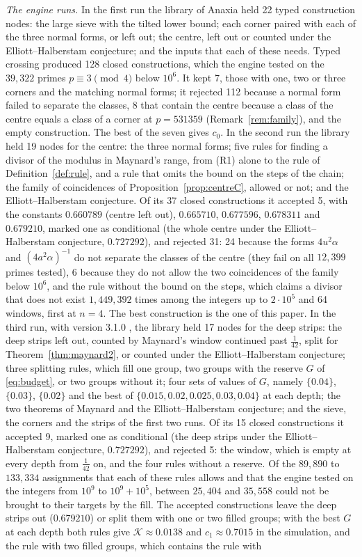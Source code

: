 \documentclass[aps,prd,twocolumn,superscriptaddress,nofootinbib,longbibliography,floatfix,showkeys,nobalancelastpage,amsmath,amssymb,10pt]{revtex4-2}
\theoremstyle{plain}
\theoremstyle{definition}
\theoremstyle{plain}
\newcommand{\Kc}{\mathcal{K}}
\newcommand{\Kmc}{0.0138}
\newcommand{\cmc}{0.7015}
\begin{document}
\emph{The engine runs.} In the first run the library of Anaxia held 22 typed construction nodes: the large sieve with the tilted lower bound; each corner paired with each of the three normal forms, or left out; the centre, left out or counted under the Elliott--Halberstam conjecture; and the inputs that each of these needs. Typed crossing produced 128 closed constructions, which the engine tested on the $39{,}322$ primes $p\equiv3\pmod4$ below $10^6$. It kept 7, those with one, two or three corners and the matching normal forms; it rejected 112 because a normal form failed to separate the classes, 8 that contain the centre because a class of the centre equals a class of a corner at $p=531359$ (Remark~\ref{rem:family}), and the empty construction. The best of the seven gives $c_0$. In the second run the library held 19 nodes for the centre: the three normal forms; five rules for finding a divisor of the modulus in Maynard's range, from (R1) alone to the rule of Definition~\ref{def:rule}, and a rule that omits the bound on the steps of the chain; the family of coincidences of Proposition~\ref{prop:centreC}, allowed or not; and the Elliott--Halberstam conjecture. Of its 37 closed constructions it accepted 5, with the constants $0.660789$ (centre left out), $0.665710$, $0.677596$, $0.678311$ and $0.679210$, marked one as conditional (the whole centre under the Elliott--Halberstam conjecture, $0.727292$), and rejected 31: 24 because the forms $4u^2\alpha$ and $(4a^2\alpha)^{-1}$ do not separate the classes of the centre (they fail on all $12{,}399$ primes tested), 6 because they do not allow the two coincidences of the family below $10^6$, and the rule without the bound on the steps, which claims a divisor that does not exist $1{,}449{,}392$ times among the integers up to $2\cdot10^5$ and 64 windows, first at $n=4$. The best construction is the one of this paper. In the third run, with version 3.1.0 \cite{Ana31}, the library held 17 nodes for the deep strips: the deep strips left out, counted by Maynard's window continued past $\frac1{42}$, split for Theorem~\ref{thm:maynard2}, or counted under the Elliott--Halberstam conjecture; three splitting rules, which fill one group, two groups with the reserve $G$ of \eqref{eq:budget}, or two groups without it; four sets of values of $G$, namely $\{0.04\}$, $\{0.03\}$, $\{0.02\}$ and the best of $\{0.015,0.02,0.025,0.03,0.04\}$ at each depth; the two theorems of Maynard and the Elliott--Halberstam conjecture; and the sieve, the corners and the strips of the first two runs. Of its 15 closed constructions it accepted 9, marked one as conditional (the deep strips under the Elliott--Halberstam conjecture, $0.727292$), and rejected 5: the window, which is empty at every depth from $\frac1{42}$ on, and the four rules without a reserve. Of the $89{,}890$ to $133{,}334$ assignments that each of these rules allows and that the engine tested on the integers from $10^9$ to $10^9+10^5$, between $25{,}404$ and $35{,}558$ could not be brought to their targets by the fill. The accepted constructions leave the deep strips out ($0.679210$) or split them with one or two filled groups; with the best $G$ at each depth both rules give $\Kc\approx\Kmc$ and $c_1\approx\cmc$ in the simulation, and the rule with two filled groups, which contains the rule with 
\end{document}
